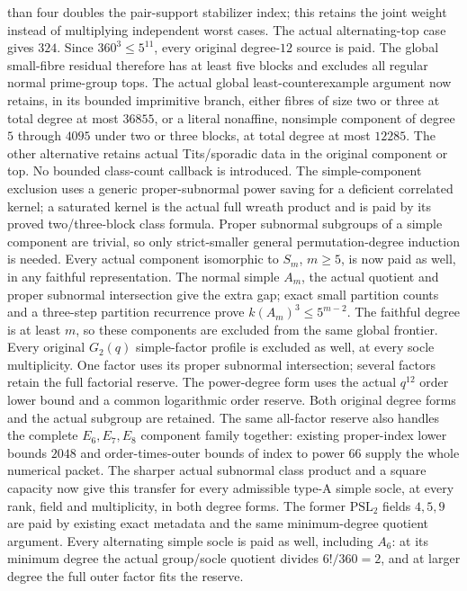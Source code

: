 than four doubles the pair-support stabilizer index; this retains the
joint weight instead of multiplying independent worst cases. The actual
alternating-top case gives $324$. Since $360^3\leq5^{11}$, every
original degree-$12$ source is paid. The global small-fibre residual
therefore has at least five blocks and excludes all regular normal
prime-group tops.
The actual global least-counterexample argument now
retains, in its bounded imprimitive branch, either fibres of size two
or three at total degree at most $36855$, or a literal nonaffine,
nonsimple component of degree $5$ through $4095$ under two or three blocks,
at total degree at most $12285$. The other alternative retains actual
Tits/sporadic data in the original component or top. No bounded
class-count callback is introduced. The simple-component exclusion
uses a generic proper-subnormal power saving for a deficient correlated
kernel; a saturated kernel is the actual full wreath product and is
paid by its proved two/three-block class formula. Proper subnormal
subgroups of a simple component are trivial, so only strict-smaller
general permutation-degree induction is needed. Every actual component
isomorphic to $S_m$, $m\geq5$, is now paid as well, in any faithful
representation. The normal simple $A_m$, the actual quotient and
proper subnormal intersection give the extra gap; exact small
partition counts and a three-step partition recurrence prove
$k(A_m)^3\leq5^{m-2}$. The faithful degree is at least $m$, so these
components are excluded from the same global frontier. Every original
$G_2(q)$ simple-factor profile is excluded as well, at every socle
multiplicity. One factor uses its proper subnormal intersection;
several factors retain the full factorial reserve. The power-degree
form uses the actual $q^{12}$ order lower bound and a common logarithmic
order reserve. Both original degree forms and the actual subgroup
are retained. The same all-factor reserve also handles the complete
$E_6,E_7,E_8$ component family together: existing proper-index lower
bounds $2048$ and order-times-outer bounds of index to power $66$
supply the whole numerical packet. The sharper actual subnormal
class product and a square capacity now give this transfer for every
admissible type-A simple socle, at every rank, field and multiplicity,
in both degree forms. The former $\mathrm{PSL}_2$ fields $4,5,9$ are
paid by existing exact metadata and the same minimum-degree quotient
argument. Every alternating simple socle is paid as well, including
$A_6$: at its minimum degree the actual group/socle quotient divides
$6!/360=2$, and at larger degree the full outer factor fits the reserve.
